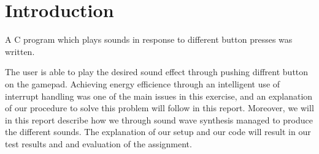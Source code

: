 \section{Introduction}

A C program which plays sounds in response to different button presses was written.

The user is able to play the desired sound effect through pushing diffrent button on the gamepad.
Achieving energy efficience through an intelligent use of interrupt handling was one of the main issues in this exercise, and an explanation of our procedure to solve this problem will follow in this report.
Moreover, we will in this report describe how we through sound wave synthesis managed to produce the different sounds.
The explanation of our setup and our code will result in our test results and and evaluation of the assignment.
